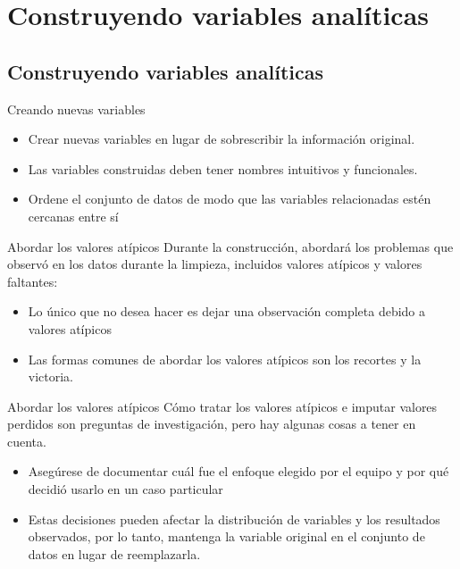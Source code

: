\documentclass[10pt, aspectratio=169, compress]{beamer}
\begin{document}
\section{Construyendo variables analíticas}
\subsection{Construyendo variables analíticas}
\begin{frame}{Creando nuevas variables}
	\begin{itemize}
		\item Crear nuevas variables en lugar de sobrescribir la información original.
		\item Las variables construidas deben tener nombres intuitivos y funcionales.
		\item Ordene el conjunto de datos de modo que las variables relacionadas estén cercanas entre sí
	\end{itemize}
\end{frame}
\begin{frame}{Abordar los valores atípicos}
	Durante la construcción, abordará los problemas que observó en los datos durante la limpieza, incluidos valores atípicos y valores faltantes: 
	\begin{itemize}[<+->]
		\item Lo único que no desea hacer es dejar una observación completa debido a valores atípicos
		\item Las formas comunes de abordar los valores atípicos son los recortes y la victoria.
	\end{itemize}
\end{frame}
\begin{frame}[<+->]{Abordar los valores atípicos}
	Cómo tratar los valores atípicos e imputar valores perdidos son preguntas de investigación, pero hay algunas cosas a tener en cuenta.
	\begin{itemize}
		\item Asegúrese de documentar cuál fue el enfoque elegido por el equipo y por qué decidió usarlo en un caso particular
		\item Estas decisiones pueden afectar la distribución de variables y los resultados observados, por lo tanto, mantenga la variable original en el conjunto de datos en lugar de reemplazarla.
	\end{itemize}
\end{frame}
\end{document}
